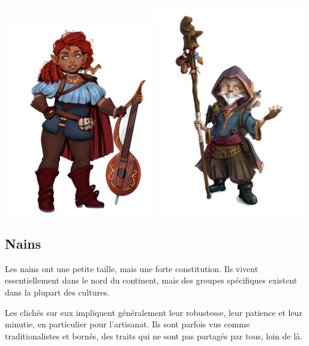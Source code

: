 \documentclass[10pt,a4paper]{book}
\begin{document}
\includegraphics[width=0.49\textwidth]{gnome 1}
\includegraphics[width=0.49\textwidth]{gnome 2}
\subsection{Nains}
Les nains ont une petite taille, mais une forte constitution. Ils vivent essentiellement dans le nord du continent, mais des groupes spécifiques existent dans la plupart des cultures.

Les clichés sur eux impliquent généralement leur robustesse, leur patience et leur minutie, en particulier pour l'artisanat. Ils sont parfois vus comme traditionalistes et bornés, des traits qui ne sont pas partagés par tous, loin de là.
\end{document}
